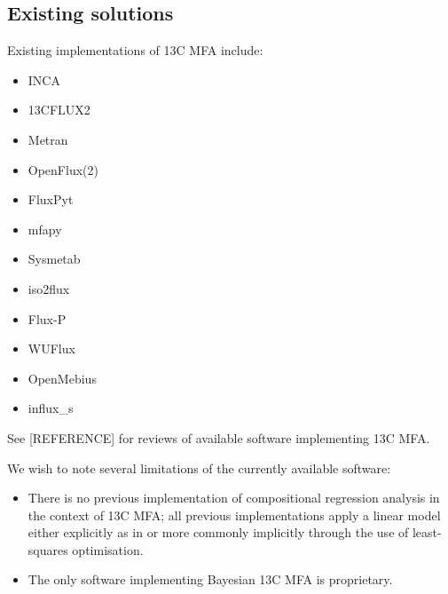 \documentclass{article}
\def\tightlist{}
\begin{document}
\subsection{Existing solutions}\label{existing-solutions}

Existing implementations of 13C MFA include:

\begin{itemize}
\tightlist
\item
  INCA
\item
  13CFLUX2
\item
  Metran
\item
  OpenFlux(2)
\item
  FluxPyt
\item
  mfapy
\item
  Sysmetab
\item
  iso2flux
\item
  Flux-P
\item
  WUFlux
\item
  OpenMebius
\item
  influx\_s
\end{itemize}

See {[}REFERENCE{]} for reviews of available software implementing 13C
MFA.

We wish to note several limitations of the currently available software:

\begin{itemize}
\tightlist
\item
  There is no previous implementation of compositional regression
  analysis in the context of 13C MFA; all previous implementations apply
  a linear model either explicitly as in \citep[Eq.
  3]{theorellBeCertainUncertainty2017} or more commonly implicitly
  through the use of least-squares optimisation.
\item
  The only software implementing Bayesian 13C MFA is proprietary.
\end{itemize}




\end{document}
